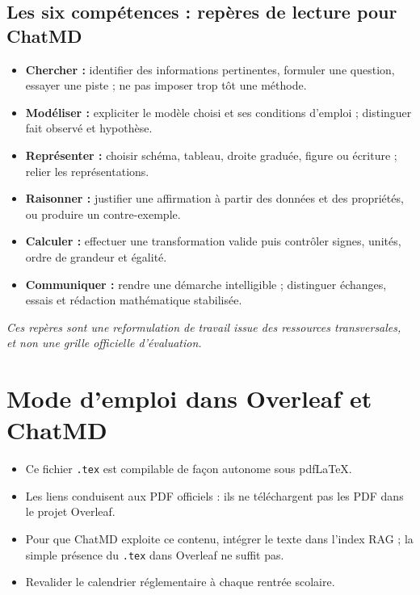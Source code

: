 \documentclass[11pt,a4paper]{article}
\begin{document}
\subsection{Les six compétences : repères de lecture pour ChatMD}
\begin{itemize}
\item \textbf{Chercher :} identifier des informations pertinentes, formuler une question, essayer une piste ; ne pas imposer trop tôt une méthode.
\item \textbf{Modéliser :} expliciter le modèle choisi et ses conditions d'emploi ; distinguer fait observé et hypothèse.
\item \textbf{Représenter :} choisir schéma, tableau, droite graduée, figure ou écriture ; relier les représentations.
\item \textbf{Raisonner :} justifier une affirmation à partir des données et des propriétés, ou produire un contre-exemple.
\item \textbf{Calculer :} effectuer une transformation valide puis contrôler signes, unités, ordre de grandeur et égalité.
\item \textbf{Communiquer :} rendre une démarche intelligible ; distinguer échanges, essais et rédaction mathématique stabilisée.
\end{itemize}
\textit{Ces repères sont une reformulation de travail issue des ressources transversales, et non une grille officielle d'évaluation.}

\section{Mode d’emploi dans Overleaf et ChatMD}
\begin{itemize}\item Ce fichier \texttt{.tex} est compilable de façon autonome sous pdfLaTeX.\item Les liens conduisent aux PDF officiels : ils ne téléchargent pas les PDF dans le projet Overleaf.\item Pour que ChatMD exploite ce contenu, intégrer le texte dans l’index RAG ; la simple présence du \texttt{.tex} dans Overleaf ne suffit pas.\item Revalider le calendrier réglementaire à chaque rentrée scolaire.\end{itemize}
\end{document}
